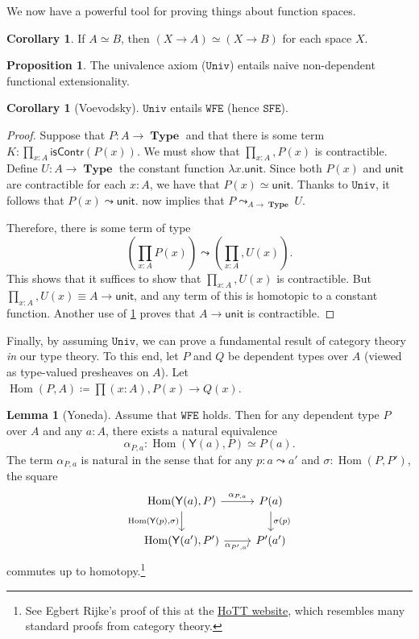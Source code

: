 \documentclass[10pt,letterpaper,cm]{nupset}
\theoremstyle{definition}
\theoremstyle{theorem}
\newtheorem{lemma}[definition]{Lemma}
\newtheorem{prop}[definition]{Proposition}
\newtheorem{corollary}[definition]{Corollary}
\theoremstyle{remark}
\newcommand{\1}{\mathbf{1}}
\newcommand{\wfe}{\mathtt{WFE}}
\newcommand{\sfe}{\mathtt{SFE}}
\newcommand{\univ}{\mathtt{Univ}}
\newcommand{\0}{\vec 0}
\DeclareMathOperator{\Hom}{Hom}
\DeclareMathOperator{\type}{\mathbf{Type}}
\begin{document}
We now have a powerful tool for proving things about function spaces.

\begin{corollary}
If $A \simeq B$, then $\left(X \to A\right) \simeq \left(X \to B\right)$ for each space $X$.
\end{corollary}

\begin{prop}\label{PP}
The univalence axiom ($\univ$) entails naive non-dependent functional extensionality. 
\end{prop}

\begin{corollary}[Voevodsky]
$\univ$ entails $\wfe$ (hence $\sfe$).
\end{corollary}
\begin{proof}
Suppose that $P: A \to \type$ and that there is some term $K: \prod_{x:A}\mathsf{isContr}(P(x))$. We must show that $\prod_{x:A}, P(x)$ is contractible.  Define $U: A \to \type$ the constant function $\lambda x. \mathsf{unit}$. Since both $P(x)$ and $ \mathsf{unit}$ are contractible for each $x:A$, we have that $P(x) \simeq  \mathsf{unit}$. Thanks to $\univ$, it follows that $P(x) \leadsto  \mathsf{unit}$.   now implies that $P\leadsto_{A \to \type} U$.

\medskip

 Therefore, there is some term of type $$  \left(\prod_{x:A} P(x) \right) \leadsto \left(\prod_{x:A}, U(x) \right)  .$$ This shows that it suffices to show that $\prod_{x:A}, U(x)$ is contractible.  But $\prod_{x:A}, U(x) \equiv A \to \mathsf{unit}$, and any term of this is homotopic to a constant function. Another use of \cref{PP} proves that $A \to \mathsf{unit}$ is contractible. 
\end{proof}

Finally, by assuming $\univ$, we can prove a fundamental result of category theory \emph{in} our type theory. To this end, let $P$ and $Q$ be dependent types over $A$ (viewed as type-valued presheaves on $A$). Let $\Hom(P, A) \coloneqq \prod(x:A), P(x) \to Q(x)$.


\begin{lemma}[Yoneda]
Assume that $\wfe$ holds. Then for any dependent type $P$ over $A$ and any $a: A$, there exists a natural equivalence $$ \alpha_{P,a} :\Hom(\mathsf{Y}(a), P)\simeq P(a) . $$ The term $ \alpha_{P,a} $ is natural in the sense that for any $p: a\leadsto a'$ and $\sigma : \Hom(P, P')$, the square
\[
\begin{tikzcd}
{\Hom(\mathsf{Y}(a), P)} \arrow[r, "{\alpha_{P,a}}"] \arrow[d, "{\Hom(\mathsf{Y}(p), \sigma)}"'] & P(a) \arrow[d, "\sigma(p)"] \\
{\Hom(\mathsf{Y}(a'), P')} \arrow[r, "{\alpha_{P', a'}}"'] & P'(a')
\end{tikzcd}\] commutes up to homotopy.\footnote{See Egbert Rijke's proof of this at the \href{https://homotopytypetheory.org/2012/05/02/a-type-theoretical-yoneda-lemma/}{HoTT website}, which resembles many standard proofs from category theory.}
\end{lemma}
\end{document}
